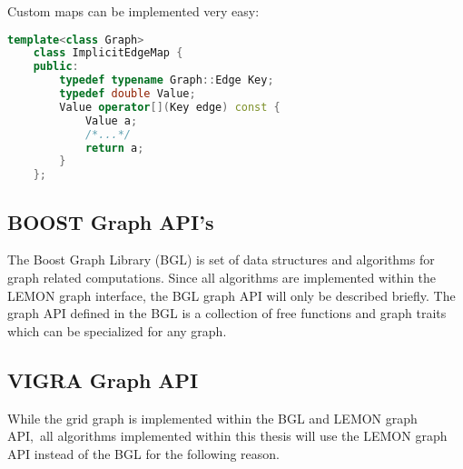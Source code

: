     Custom maps can be implemented very easy:

    \begin{minipage}{\textwidth}\vspace{-0.75cm}\begin{lstlisting}[language=c++]
    template<class Graph>
    class ImplicitEdgeMap {
    public:
        typedef typename Graph::Edge Key;
        typedef double Value;
        Value operator[](Key edge) const { 
            Value a;
            /*...*/
            return a;
        }
    };
    \end{lstlisting}\end{minipage}\vspace{0.5cm}

\subsection{BOOST Graph API's}\label{sec:boost_graph_apis}
The Boost Graph Library (BGL)  \cite{software_bgl} is set of data structures and 
algorithms for graph related computations.
Since all algorithms are implemented within the LEMON graph interface, 
the BGL graph API will only be described briefly.
The graph API defined in the BGL is a collection of
free functions and graph traits which can be specialized for
any graph.




\subsection{VIGRA Graph API}

While the grid graph is implemented within the BGL and LEMON graph API,\
all algorithms implemented within this thesis will
use the LEMON graph API instead of the BGL 
for the following reason.

